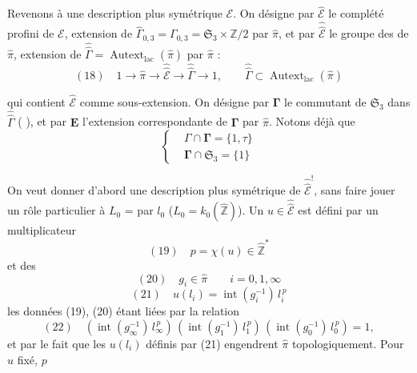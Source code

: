 \documentclass[11pt,a4paper]{article}
\begin{document}
Revenons à une description plus symétrique 
$\mathcal{E}$. On désigne par $\hat{\mathcal{E}}$ le complété profini de $\mathcal{E}$,
extension de $\hat\Gamma_{0,3} = \Gamma_{0,3} = \mathfrak{S}_3 \times
\mathbb{Z}/2$ par $\hat\pi$, et par $\hat{\hat{\mathcal{E}}}$ le groupe des
  
de $\hat\pi$, extension de $\hat{\hat\Gamma} =
\operatorname{Autext}_{\mathrm{lac}}(\hat\pi)$ par $\hat\pi$ :
\[
(18)\quad 1 \longrightarrow \hat\pi \longrightarrow \hat{\hat{\mathcal{E}}}
\longrightarrow \hat{\hat\Gamma} \longrightarrow 1,
\qquad \hat{\hat\Gamma} \subset \operatorname{Autext}_{\mathrm{lac}}(\hat\pi)
\]


qui contient $\hat{\mathcal{E}}$ comme sous-extension. On désigne par
$\boldsymbol{\Gamma}$ le commutant de $\mathfrak{S}_3$ dans
$\hat{\hat\Gamma}$ (\ill{} \ill{}), et par $\mathbf{E}$ l'extension
correspondante de $\boldsymbol{\Gamma}$ par $\hat\pi$. Notons déjà que
\[
\left\{
\begin{aligned}
&\Gamma \cap \boldsymbol{\Gamma} = \{1, \tau\}\\
&\boldsymbol{\Gamma} \cap \mathfrak{S}_3 = \{1\}
\end{aligned}
\right.
\]


On veut donner d'abord une description plus symétrique de
$\hat{\hat{\mathcal{E}}}^{!}$, sans faire jouer un rôle particulier à
$L_0$ =  par $l_0$
($L_0 = k_0(\hat{\mathbb{Z}})$). Un $u \in \hat{\hat{\mathcal{E}}}$ est défini par
un multiplicateur
\[
(19)\quad p = \chi(u) \in \hat{\mathbb{Z}}^{*}
\]
et des
\[
(20)\quad g_i \in \hat\pi \qquad i = 0, 1, \infty
\]
\struck{\ill{}}
\[
(21)\quad u(l_i) = \operatorname{int}(g_i^{-1})\, l_i^{\,p}
\]
les données (19), (20) étant liées par la relation
\[
(22)\quad (\operatorname{int}(g_\infty^{-1})\, l_\infty^{\,p})\,
(\operatorname{int}(g_1^{-1})\, l_1^{\,p})\,
(\operatorname{int}(g_0^{-1})\, l_0^{\,p}) = 1,
\]
et par le fait que les $u(l_i)$ définis par (21) engendrent $\hat\pi$
topologiquement. Pour $u$ fixé, $p$
\end{document}
